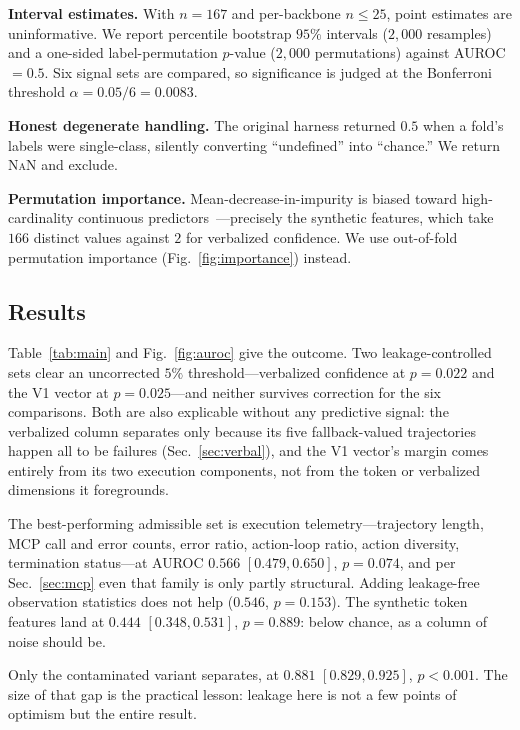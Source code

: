 \documentclass[conference]{IEEEtran}
\begin{document}
\textbf{Interval estimates.} With $n = 167$ and per-backbone $n \le 25$, point
estimates are uninformative. We report percentile bootstrap $95\%$ intervals
($2{,}000$ resamples) and a one-sided label-permutation $p$-value
($2{,}000$ permutations) against AUROC${}=0.5$. Six signal sets are compared,
so significance is judged at the Bonferroni threshold $\alpha = 0.05/6 =
0.0083$.

\textbf{Honest degenerate handling.} The original harness returned $0.5$ when a
fold's labels were single-class, silently converting ``undefined'' into
``chance.'' We return \textsc{NaN} and exclude.

\textbf{Permutation importance.} Mean-decrease-in-impurity is biased toward
high-cardinality continuous predictors~\cite{strobl}---precisely the synthetic
features, which take $166$ distinct values against $2$ for verbalized
confidence. We use out-of-fold permutation importance
(Fig.~\ref{fig:importance}) instead.

\subsection{Results}

Table~\ref{tab:main} and Fig.~\ref{fig:auroc} give the outcome. Two
leakage-controlled sets clear an uncorrected $5\%$ threshold---verbalized
confidence at $p = 0.022$ and the V1 vector at $p = 0.025$---and neither
survives correction for the six comparisons. Both are also explicable without
any predictive signal: the verbalized column separates only because its five
fallback-valued trajectories happen all to be failures
(Sec.~\ref{sec:verbal}), and the V1 vector's margin comes entirely from its two
execution components, not from the token or verbalized dimensions it
foregrounds.

The best-performing admissible set is execution telemetry---trajectory length,
MCP call and error counts, error ratio, action-loop ratio, action diversity,
termination status---at AUROC $0.566$ $[0.479, 0.650]$, $p = 0.074$, and per
Sec.~\ref{sec:mcp} even that family is only partly structural. Adding
leakage-free observation statistics does not help ($0.546$, $p = 0.153$). The
synthetic token features land at $0.444$ $[0.348, 0.531]$, $p = 0.889$: below
chance, as a column of noise should be.

Only the contaminated variant separates, at $0.881$ $[0.829, 0.925]$,
$p < 0.001$. The size of that gap is the practical lesson: leakage here is not a
few points of optimism but the entire result.
\end{document}
